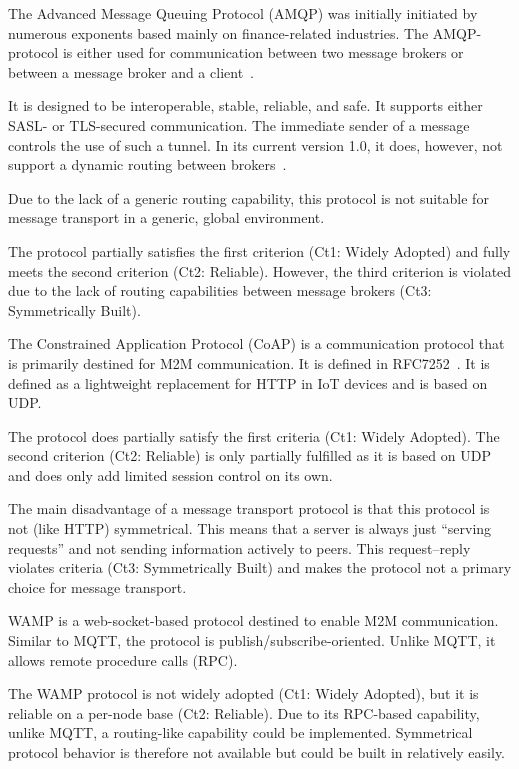 The Advanced Message Queuing Protocol (AMQP) was initially initiated by numerous exponents based mainly on finance-related industries. The AMQP-protocol is either used for communication between two message brokers or between a message broker and a client~\cite{amqp}.

It is designed to be interoperable, stable, reliable, and safe. It supports either SASL- or TLS-secured communication. The immediate sender of a message controls the use of such a tunnel. In its current version 1.0, it does, however, not support a dynamic routing between brokers~\cite{amqp}.

Due to the lack of a generic routing capability, this protocol is not suitable for message transport in a generic, global environment.

The protocol partially satisfies the first criterion (Ct1: Widely Adopted) and fully meets the second criterion (Ct2: Reliable). However, the third criterion is violated due to the lack of routing capabilities between message brokers (Ct3: Symmetrically Built).

The Constrained Application Protocol (CoAP) is a communication protocol that is primarily destined for M2M communication. It is defined in RFC7252~\cite{rfc7252}. It is defined as a lightweight replacement for HTTP in IoT devices and is based on UDP.

The protocol does partially satisfy the first criteria (Ct1: Widely Adopted). The second criterion (Ct2: Reliable) is only partially fulfilled as it is based on UDP and does only add limited session control on its own.

The main disadvantage of a message transport protocol is that this protocol is not (like HTTP) symmetrical. This means that a server is always just ``serving requests'' and not sending information actively to peers. This request--reply violates criteria (Ct3: Symmetrically Built) and makes the protocol not a primary choice for message transport. 

WAMP is a web-socket-based protocol destined to enable M2M communication. Similar to MQTT, the protocol is publish/subscribe-oriented. Unlike MQTT, it allows remote procedure calls (RPC).

The WAMP protocol is not widely adopted (Ct1: Widely Adopted), but it is reliable on a per-node base (Ct2: Reliable). Due to its RPC-based capability, unlike MQTT, a routing-like capability could be implemented. Symmetrical protocol behavior is therefore not available but could be built in relatively easily.


